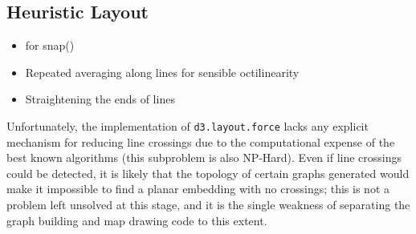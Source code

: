 \subsection{Heuristic Layout}
\begin{itemize}
	\item \cite{AutomaticMetroMapLayoutThesis, AutomaticMetroMapLayout} for snap()
	\item Repeated averaging along lines for sensible octilinearity
	\item Straightening the ends of lines
\end{itemize}

Unfortunately, the implementation of \texttt{d3.layout.force} lacks any explicit mechanism for reducing line crossings due to the computational expense of the best known algorithms (this subproblem is also NP-Hard). Even if line crossings could be detected, it is likely that the topology of certain graphs generated would make it impossible to find a planar embedding with no crossings; this is not a problem left unsolved at this stage, and it is the single weakness of separating the graph building and map drawing code to this extent. 
